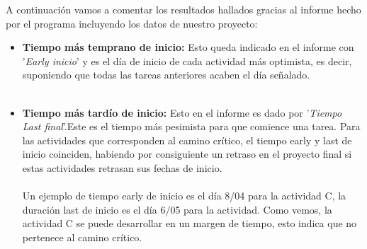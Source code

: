\documentclass[11pt,letterpaper,onecolumn]{article}
\begin{document}
A continuación vamos a comentar los resultados hallados gracias al informe hecho por el programa incluyendo los datos de nuestro proyecto:
\\

\begin{itemize}
    \item{\textbf{Tiempo más temprano de inicio:}} Esto queda indicado en el informe con '\textit{Early inicio}' y es el día de inicio de cada actividad más optimista, es decir, suponiendo que todas las tareas anteriores acaben el día señalado. \\
\\


    \item{\textbf{Tiempo más tardío de inicio:}} Esto en el informe es dado por '\textit{Tiempo Last final}'.Este es el tiempo más pesimista para que comience una tarea. Para las actividades que corresponden al camino crítico, el tiempo early y last de inicio coinciden, habiendo por consiguiente un retraso en el proyecto final si estas actividades retrasan sus fechas de inicio.\\
\\
Un ejemplo de tiempo early de inicio es el día 8/04 para la actividad C, la duración last de inicio es el día 6/05 para la actividad. Como vemos, la actividad C se puede desarrollar en un margen de tiempo, esto indica que no pertenece al camino crítico.
\\


\end{itemize}
\end{document}
